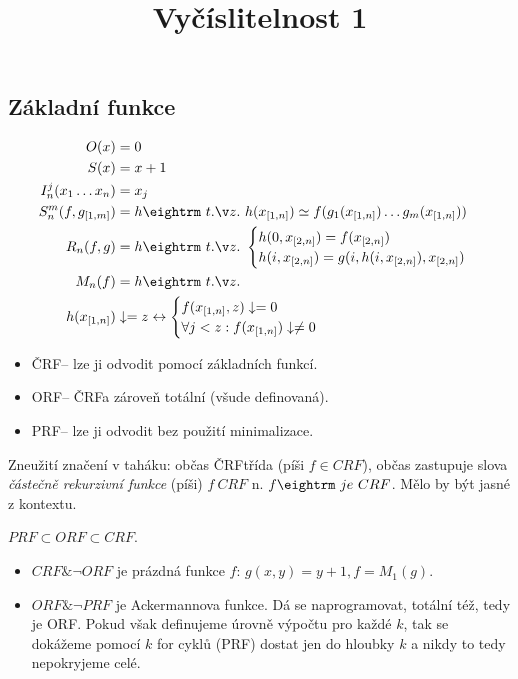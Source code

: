 
\usepackage[czech]{babel}

\begin{multicols}{3}

\newcommand{\ORF}{{\sc ORF}}
\newcommand{\PRF}{{\sc PRF}}
\newcommand{\CRF}{{\sc ČRF}}

\title{Vyčíslitelnost 1}
\section{Základní funkce}
\begin{align*}
O(x) &= 0\\
S(x) &= x+1\\
I^j_n(x_1 \dots x_n) &= x_j\\
S^m_n(f, g_{[1,m]}) &= h \st h(x_{[1,n]}) \simeq f(g_1(x_{[1,n]}) \dots g_m(x_{[1,n]})) \\
R_n(f,g) &= h \st \begin{cases}
h(0,x_{[2,n]}) = f(x_{[2,n]}) \\
h(i, x_{[2,n]}) = g(i, h(i, x_{[2,n]}), x_{[2,n]})
\end{cases} \\
M_n(f) &= h \st \\
h(x_{[1,n]}) &\daeq z \iff \begin{cases}
f(x_{[1,n]}, z) \daeq 0 \\
\forall j < z: f(x_{[1,n]}) \daneq 0
\end{cases}
\end{align*}

\begin{itemize}
\item  \CRF -- lze ji odvodit pomocí základních funkcí.
\item  \ORF -- \CRF a zároveň totální (všude definovaná).
\item  \PRF -- lze ji odvodit bez použití minimalizace.
\end{itemize}

\obs{} Zneužití značení v taháku: občas \CRF třída (píši $f \in CRF$), občas zastupuje slova
\textit{ částečně rekurzivní funkce} (píši) $f\ CRF$ n. $f {\rm\ je\ } CRF$. Mělo by být jasné
z kontextu.

\thm{} $PRF \subset ORF \subset CRF$.

\prf{}

\begin{itemize}
\item  $CRF \&\neg ORF$ je prázdná funkce $f$: $g(x,y) = y+1, f = M_1(g)$.
\item  $ORF \&\neg PRF$ je Ackermannova funkce. Dá se naprogramovat, totální též, tedy je \ORF. Pokud však definujeme
úrovně výpočtu pro každé $k$, tak se dokážeme pomocí $k$ for cyklů (\PRF) dostat jen do hloubky $k$ a nikdy to
tedy nepokryjeme celé.
\end{itemize}


\end{multicols}
